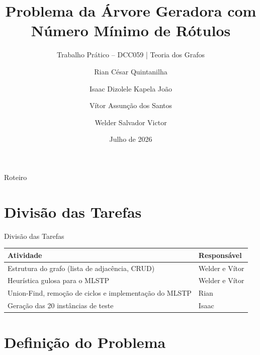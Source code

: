 \documentclass{beamer}
\title{Problema da Árvore Geradora com Número Mínimo de Rótulos}
\subtitle{Trabalho Prático -- DCC059 | Teoria dos Grafos}
\author{
    Rian César Quintanilha \and
    Isaac Dizolele Kapela João \and
    Vítor Assunção dos Santos \and
    Welder Salvador Victor
}
\institute{Universidade Federal de Juiz de Fora (UFJF)}
\date{Julho de 2026}
\begin{document}

\begin{frame}
    \titlepage
\end{frame}


\begin{frame}{Roteiro}
    \tableofcontents
\end{frame}

\section{Divisão das Tarefas}

\begin{frame}{Divisão das Tarefas}

\begin{table}[h]
\centering
\renewcommand{\arraystretch}{1.5}
\begin{tabular}{p{6.8cm} p{3.8cm}}
\toprule
\textbf{Atividade} & \textbf{Responsável} \\
\midrule
Estrutura do grafo (lista de adjacência, CRUD) & Welder e Vítor \\
\addlinespace
Heurística gulosa para o MLSTP & Welder e Vítor \\
\addlinespace
Union-Find, remoção de ciclos e implementação do MLSTP & Rian \\
\addlinespace
Geração das 20 instâncias de teste & Isaac \\
\bottomrule
\end{tabular}
\end{table}

\end{frame}

\section{Definição do Problema}
\end{document}
